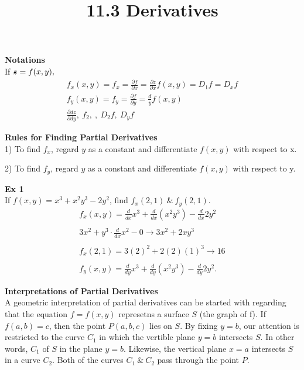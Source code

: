 \documentclass{article}
\title{11.3 Derivatives}
\begin{document}
  \maketitle
  \textbf{Notations}\\
  If $ \zstroke = f(x,y), $
  \[
    \begin{gathered}
    f_{x}(x,y)=f_{x}=\frac{\partial f}{\partial x}=\frac{\partial z}{\partial x} f(x,y) = D_1f = D_xf\\
    f_{y}(x,y)=f_{y}=\frac{\partial f}{\partial y}=\frac{d}{y} f(x,y)\\
    \frac{\partial dz}{\partial dy},~ f_{2},~,~D_{2}f,~D_{y}f    
    \end{gathered}
  \]

  \textbf{Rules for Finding Partial Derivatives}\\
  1) To find $ f_{x} $, regard $ y $ as a constant and differentiate $ f(x,y) $ with respect to x.

  2) To find $ f_{y}  $, regard $ y $ as a constant and differentiate $ f(x,y) $ with respect to y.

  \textbf{Ex 1}\\
  If $ f(x,y) =x^{3}+x^{2}y^{3}-2y^{2}    $, find $ f_{x}(2,1) ~\&~ f_{y}(2,1)$.
  \[
    \begin{gathered}
      f_{x}(x,y)= \frac{d}{dx}x^{3}+\frac{d}{dx}(x^{2}y^{3})-\frac{d}{dx}{2y^{2}}\\
      ~\\
      3x^{2}+  y^{3} \cdot \frac{d}{dx}x^{2}-0\to 3x^{2}+2xy^{3}\\
      ~\\
      f_{x}(2,1) = 3(2)^{2} + 2(2)(1)^{3}\to \boxed{16}\\
      ~\\
      f_{y}(x,y)= \frac{d}{dy}x^{3}+\frac{d}{dy}(x^{2}y^{3})-\frac{d}{dy}2y^{2}.      
    \end{gathered}
  \]

  \textbf{Interpretations of Partial Derivatives}\\
  A geometric interpretation of partial derivatives can be started with regarding that the equation $ f=f(x,y) $ represetns a surface $ S $ (the graph of f). If $ f(a,b) = c$, then the point $ P(a,b,c) $ lies on $ S $. By fixing $ y=b $, our attention is restricted to the curve $ C_1 $ in which the vertible plane $ y=b $ intersects $ S $. In other words, $ C_1 $ of $ S $ in the plane $ y=b $. Likewise, the vertical plane $ x=a $ intersects $ S $ in a curve $ C_2 $. Both of the curves $ C_1 ~\&~ C_2 $ pass through the point $ P $.
  
\end{document}
